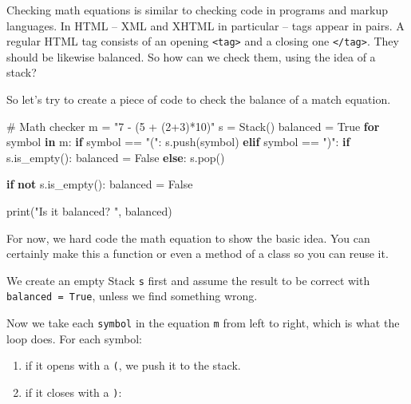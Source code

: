 \documentclass[
  letterpaper,
]{scrbook}
\newenvironment{Shaded}{\begin{snugshade}}{\end{snugshade}}
\newcommand{\BuiltInTok}[1]{\textcolor[rgb]{0.00,0.23,0.31}{#1}}
\newcommand{\CommentTok}[1]{\textcolor[rgb]{0.37,0.37,0.37}{#1}}
\newcommand{\ControlFlowTok}[1]{\textcolor[rgb]{0.00,0.23,0.31}{\textbf{#1}}}
\newcommand{\KeywordTok}[1]{\textcolor[rgb]{0.00,0.23,0.31}{\textbf{#1}}}
\newcommand{\NormalTok}[1]{\textcolor[rgb]{0.00,0.23,0.31}{#1}}
\newcommand{\OperatorTok}[1]{\textcolor[rgb]{0.37,0.37,0.37}{#1}}
\newcommand{\StringTok}[1]{\textcolor[rgb]{0.13,0.47,0.30}{#1}}
\newcommand{\VariableTok}[1]{\textcolor[rgb]{0.07,0.07,0.07}{#1}}
\providecommand{\tightlist}{%
  \setlength{\itemsep}{0pt}\setlength{\parskip}{0pt}}
\begin{document}
Checking math equations is similar to checking code in programs and
markup languages. In HTML -- XML and XHTML in particular -- tags appear
in pairs. A regular HTML tag consists of an opening
\texttt{\textless{}tag\textgreater{}} and a closing one
\texttt{\textless{}/tag\textgreater{}}. They should be likewise
balanced. So how can we check them, using the idea of a stack?

So let's try to create a piece of code to check the balance of a match
equation.

\begin{Shaded}
\begin{Highlighting}[]
\CommentTok{\# Math checker}
\NormalTok{m }\OperatorTok{=} \StringTok{"7 {-} (5 + (2+3)*10)"}
\NormalTok{s }\OperatorTok{=}\NormalTok{ Stack()}
\NormalTok{balanced }\OperatorTok{=} \VariableTok{True}
\ControlFlowTok{for}\NormalTok{ symbol }\KeywordTok{in}\NormalTok{ m: }
    \ControlFlowTok{if}\NormalTok{ symbol }\OperatorTok{==} \StringTok{"("}\NormalTok{:}
\NormalTok{        s.push(symbol)}
    \ControlFlowTok{elif}\NormalTok{ symbol }\OperatorTok{==} \StringTok{")"}\NormalTok{:}
        \ControlFlowTok{if}\NormalTok{ s.is\_empty():}
\NormalTok{            balanced }\OperatorTok{=} \VariableTok{False}
        \ControlFlowTok{else}\NormalTok{:}
\NormalTok{            s.pop()}

\ControlFlowTok{if} \KeywordTok{not}\NormalTok{ s.is\_empty():}
\NormalTok{    balanced }\OperatorTok{=} \VariableTok{False}

\BuiltInTok{print}\NormalTok{(}\StringTok{"Is it balanced? "}\NormalTok{, balanced)}
\end{Highlighting}
\end{Shaded}

For now, we hard code the math equation to show the basic idea. You can
certainly make this a function or even a method of a class so you can
reuse it.

We create an empty Stack \texttt{s} first and assume the result to be
correct with \texttt{balanced\ =\ True}, unless we find something wrong.

Now we take each \texttt{symbol} in the equation \texttt{m} from left to
right, which is what the loop does. For each symbol:

\begin{enumerate}
\def\labelenumi{\arabic{enumi}.}
\tightlist
\item
  if it opens with a \texttt{(}, we push it to the stack.
\item
  if it closes with a \texttt{)}:
\end{enumerate}
\end{document}
